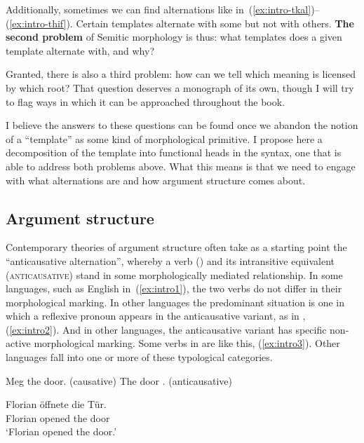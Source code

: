 \begin{exe}
\begin{xlist}
\begin{exe}
\begin{exe}
\begin{exe}
\begin{exe}
\begin{xlist}
Additionally, sometimes we can find alternations like in~(\ref{ex:intro-tkal})--(\ref{ex:intro-thif}). Certain templates alternate with some but not with others. \textbf{The second problem} of Semitic morphology is thus: what templates does a given template alternate with, and why?

Granted, there is also a third problem: how can we tell which meaning is licensed by which root? That question deserves a monograph of its own, though I will try to flag ways in which it can be approached throughout the book.

I believe the answers to these questions can be found once we abandon the notion of a ``template'' as some kind of morphological primitive. I propose here a decomposition of the template into functional heads in the syntax, one that is able to address both problems above. What this means is that we need to engage with what alternations are and how argument structure comes about.

	\subsection{Argument structure}
Contemporary theories of argument structure often take as a starting point the ``anticausative alternation'', whereby a  verb (\textsc{}) and its intransitive equivalent (\textsc{anticausative}) stand in some morphologically mediated relationship. In some languages, such as English in~(\ref{ex:intro1}), the two verbs do not differ in their morphological marking. In other languages the predominant situation is one in which a reflexive pronoun appears in the anticausative variant, as in , (\ref{ex:intro2}). And in other languages, the anticausative variant has specific non-active morphological marking. Some verbs in  are like this, (\ref{ex:intro3}). Other languages fall into one or more of these typological categories.
 \begin{exe}
 \ex \label{ex:intro1} 
 \begin{xlist} 
 	\ex  Meg the door. \hfill (causative) 
  	\ex  The door .			\hfill (anticausative) 
 \z

 \ex {} \label{ex:intro2} 
 \begin{xlist} 
 	\ex   
 		\gll Florian \"offnete die T\"ur.\\
		 Florian opened the door\\ 
 		\glt `Florian opened the door.' 
	

\end{xlist}
\end{xlist}
\end{exe}
\end{xlist}
\end{exe}
\end{exe}
\end{exe}
\end{exe}
\end{xlist}
\end{exe}
